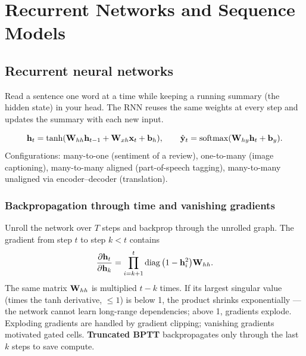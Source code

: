\chapter{Recurrent Networks and Sequence Models}

\section{Recurrent neural networks}
\begin{intuition}
Read a sentence one word at a time while keeping a running summary (the hidden state) in your head. The RNN reuses the same weights at every step and updates the summary with each new input.
\end{intuition}
\[\mathbf{h}_t=\tanh(\mathbf{W}_{hh}\mathbf{h}_{t-1}+\mathbf{W}_{xh}\mathbf{x}_t+\mathbf{b}_h),\qquad\hat{\mathbf{y}}_t=\operatorname{softmax}(\mathbf{W}_{hy}\mathbf{h}_t+\mathbf{b}_y).\]
Configurations: many-to-one (sentiment of a review), one-to-many (image captioning), many-to-many aligned (part-of-speech tagging), many-to-many unaligned via encoder--decoder (translation).

\subsection{Backpropagation through time and vanishing gradients}
Unroll the network over $T$ steps and backprop through the unrolled graph. The gradient from step $t$ to step $k<t$ contains
\[\frac{\partial\mathbf{h}_t}{\partial\mathbf{h}_k}=\prod_{i=k+1}^{t}\operatorname{diag}\big(1-\mathbf{h}_i^2\big)\mathbf{W}_{hh}.\]
The same matrix $\mathbf{W}_{hh}$ is multiplied $t-k$ times. If its largest singular value (times the tanh derivative, $\le1$) is below 1, the product shrinks exponentially --- the network cannot learn long-range dependencies; above 1, gradients explode. Exploding gradients are handled by gradient clipping; vanishing gradients motivated gated cells. \textbf{Truncated BPTT} backpropagates only through the last $k$ steps to save compute.

